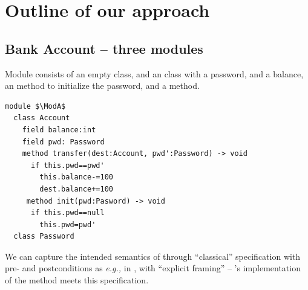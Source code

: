 

\section{Outline of our approach}
\label{s:outline}


 \subsection{Bank Account -- three modules}
\label{s:bank}
  
Module \ModA consists of an empty 
 class, and an   class with a password, and a balance, an  method to 
initialize the password, and 
a
 method. 
%
%
%
%
% 
\begin{lstlisting}[mathescape=true, language=Chainmail, frame=lines]
module $\ModA$
  class Account
    field balance:int 
    field pwd: Password
    method transfer(dest:Account, pwd':Password) -> void
      if this.pwd==pwd'
        this.balance-=100
        dest.balance+=100
     method init(pwd:Pasword) -> void
      if this.pwd==null
        this.pwd=pwd'
  class Password
\end{lstlisting}
%
\noindent 
We can capture the intended
semantics of  
through   ``classical''
specification with pre- and postconditions as \emph{e.g.,} in \cite{Leavens-etal07,dafny13},
with ``explicit framing'' --   
\ModA's implementation of the  method meets
this specification.



